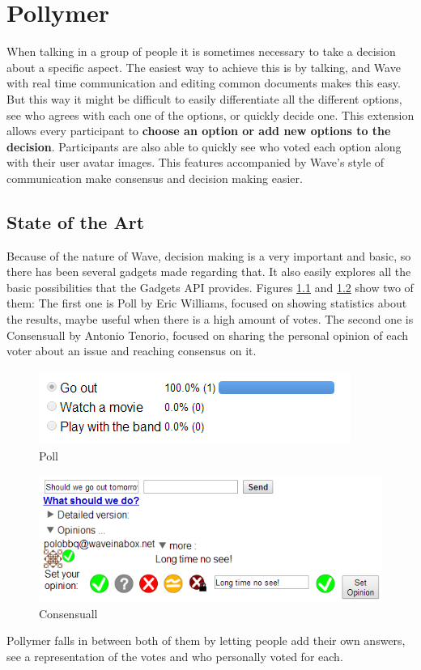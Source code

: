 \thispagestyle{sectioned}
\chapter{Pollymer}
When talking in a group of people it is sometimes necessary to take a decision about a specific aspect. The easiest way to achieve this is by talking, and Wave with real time communication and editing common documents makes this easy. But this way it might be difficult to easily differentiate all the different options, see who agrees with each one of the options, or quickly decide one. This extension allows every participant to \textbf{choose an option or add new options to the decision}. Participants are also able to quickly see who voted each option along with their user avatar images. This features accompanied by Wave's style of communication make consensus and decision making easier.

\label{subsec:decision_soa}
\section{State of the Art}
Because of the nature of Wave, decision making is a very important and basic, so there has been several gadgets made regarding that. It also easily explores all the basic possibilities that the Gadgets API provides. Figures \ref{fig:poll} and \ref{fig:consensuall} show two of them: The first one is Poll by Eric Williams, focused on showing statistics about the results, maybe useful when there is a high amount of votes. The second one is Consensuall \cite{ref:consensuall} by Antonio Tenorio, focused on sharing the personal opinion of each voter about an issue and reaching consensus on it.\\[.2cm]
\begin{figure}[h]
  \center
    \includegraphics[keepaspectratio, scale=0.7]{Media/Captures/Extensions/DecisionGadgets/other.png}
  \caption{Poll}
  \label{fig:poll}
\end{figure}
\begin{figure}[h]
  \center    
    \includegraphics[keepaspectratio, scale=0.7]{Media/Captures/Extensions/DecisionGadgets/consensuall.png}
  \caption{Consensuall}
  \label{fig:consensuall}
\end{figure}
Pollymer falls in between both of them by letting people add their own answers, see a representation of the votes and who personally voted for each.

